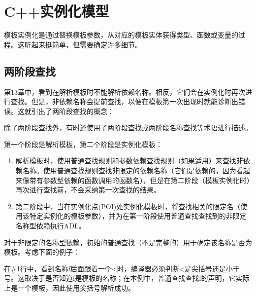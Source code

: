 \section{C++实例化模型}

模板实例化是通过替换模板参数，从对应的模板实体获得类型、函数或变量的过程。这听起来挺简单，但需要确定许多细节。

\subsection{两阶段查找}

第13章中，看到在解析模板时不能解析依赖名称。相反，它们会在实例化时再次进行查找。但是，非依赖名称会提前查找，以便在模板第一次出现时就能诊断出错误。这就引出了两阶段查找的概念：

\begin{notice}
除了两阶段查找外，有时还使用了两阶段查找或两阶段名称查找等术语进行描述。
\end{notice}

第一个阶段是解析模板，第二个阶段是实例化模板：

\begin{enumerate}
\item 
解析模板时，使用普通查找规则和参数依赖查找规则（如果适用）来查找非依赖名称。使用普通查找规则查找非限定的依赖名称（它们是依赖的，因为看起来像带有参数型依赖的函数调用的函数名），但是在第二阶段（模板实例化时）再次进行查找前，不会采纳第一次查找的结果。

\item 
第二阶段中，当在实例化点(POI)处实例化模板时，将查找相关的限定名（使用该特定实例化的模板参数），并为在第一阶段使用普通查找查找到的非限定名称型依赖执行ADL。
\end{enumerate}

对于非限定的名称型依赖，初始的普通查找（不是完整的）用于确定该名称是否为模板。考虑下面的例子：


在\#1行中，看到名称f后面跟着一个<时，编译器必须判断<是尖括号还是小于号。这取决于是否知道f是模板的名称；在本例中，普通查找查找f的声明，它实际上是一个模板，因此使用尖括号解析成功。

